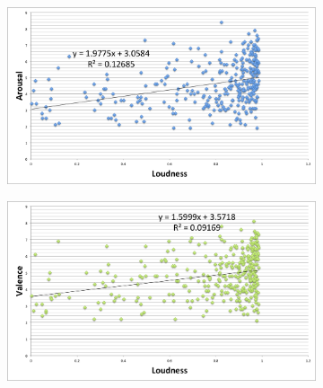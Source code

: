 \begin{figure}
         \centering
        \begin{subfigure}[b]{0.48\textwidth}
                \includegraphics[width=\textwidth]{Figures/loudness-arousal}
			   \vspace{20pt}
        \end{subfigure}
        \begin{subfigure}[b]{0.48\textwidth}
                \includegraphics[width=\textwidth]{Figures/loudness-valence}
                  \vspace{20pt}
        \end{subfigure}
        

\end{figure}
